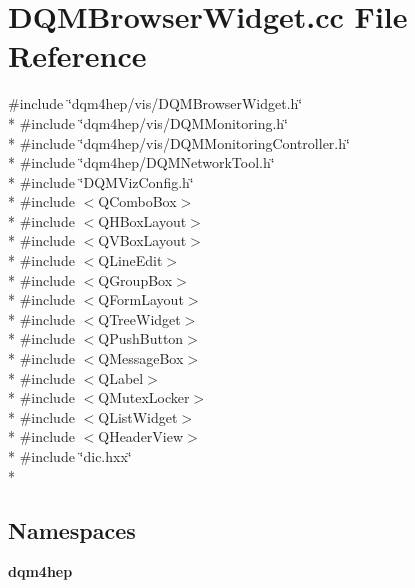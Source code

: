 \section{D\+Q\+M\+Browser\+Widget.\+cc File Reference}
\label{DQMBrowserWidget_8cc}
{\ttfamily \#include \char`\"{}dqm4hep/vis/\+D\+Q\+M\+Browser\+Widget.\+h\char`\"{}}\\*
{\ttfamily \#include \char`\"{}dqm4hep/vis/\+D\+Q\+M\+Monitoring.\+h\char`\"{}}\\*
{\ttfamily \#include \char`\"{}dqm4hep/vis/\+D\+Q\+M\+Monitoring\+Controller.\+h\char`\"{}}\\*
{\ttfamily \#include \char`\"{}dqm4hep/\+D\+Q\+M\+Network\+Tool.\+h\char`\"{}}\\*
{\ttfamily \#include \char`\"{}D\+Q\+M\+Viz\+Config.\+h\char`\"{}}\\*
{\ttfamily \#include $<$Q\+Combo\+Box$>$}\\*
{\ttfamily \#include $<$Q\+H\+Box\+Layout$>$}\\*
{\ttfamily \#include $<$Q\+V\+Box\+Layout$>$}\\*
{\ttfamily \#include $<$Q\+Line\+Edit$>$}\\*
{\ttfamily \#include $<$Q\+Group\+Box$>$}\\*
{\ttfamily \#include $<$Q\+Form\+Layout$>$}\\*
{\ttfamily \#include $<$Q\+Tree\+Widget$>$}\\*
{\ttfamily \#include $<$Q\+Push\+Button$>$}\\*
{\ttfamily \#include $<$Q\+Message\+Box$>$}\\*
{\ttfamily \#include $<$Q\+Label$>$}\\*
{\ttfamily \#include $<$Q\+Mutex\+Locker$>$}\\*
{\ttfamily \#include $<$Q\+List\+Widget$>$}\\*
{\ttfamily \#include $<$Q\+Header\+View$>$}\\*
{\ttfamily \#include \char`\"{}dic.\+hxx\char`\"{}}\\*
\subsection*{Namespaces}
\begin{DoxyCompactItemize}
\item 
 {\bf dqm4hep}
\end{DoxyCompactItemize}
